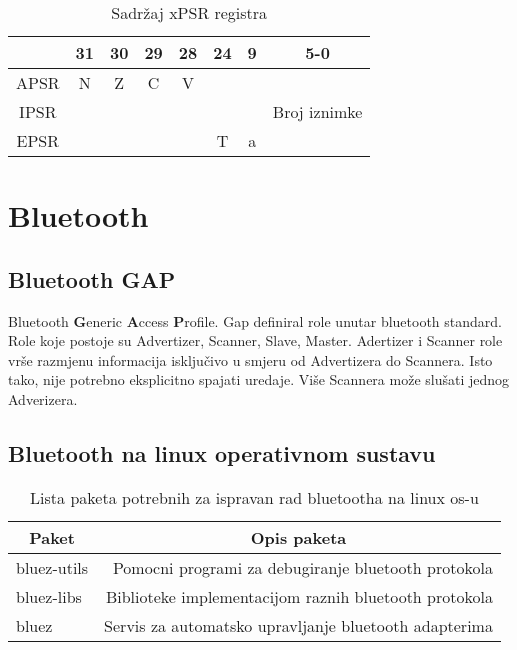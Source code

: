 \documentclass[times, utf8, diplomski]{fer}
\begin{document}
\begin{table}[h]
  \begin{center}
    \begin{tabular}{c|c|c|c|c||c||c||c|}
      \cline{2-8} & 31 & 30 & 29 & 28 & 24 & 9 & 5-0\\
      \hline
      \multicolumn{1}{|c|}{APSR} & N & Z & C & V & \multicolumn{3}{c|}{ } \\
      \hline
      \multicolumn{1}{|c|}{IPSR} & \multicolumn{6}{c||}{ } & Broj iznimke \\
      \hline
      \multicolumn{1}{|c|}{EPSR} & \multicolumn{4}{c||}{ } & T & a & \\
      \hline
    \end{tabular}
    \caption{Sadr\v{z}aj xPSR registra}
  \end{center}
\end{table}

\newpage
\section{Bluetooth}
\subsection{Bluetooth GAP}
Bluetooth \textbf{G}eneric \textbf{A}ccess \textbf{P}rofile.
Gap definiral role unutar bluetooth standard. Role koje postoje su Advertizer, Scanner, Slave, Master. Adertizer i Scanner role vr\v{s}e razmjenu informacija isklju\v{c}ivo u smjeru
od Advertizera do Scannera. Isto tako, nije potrebno eksplicitno spajati uredaje.
Vi\v{s}e Scannera mo\v{z}e slu\v{s}ati jednog Adverizera.

\subsection{Bluetooth na linux operativnom sustavu}

\begin{table}[h]
  \begin{center}
    \begin{tabular}[c]{l|r}
      \multicolumn{1}{c|}{\textbf{Paket}} & 
      \multicolumn{1}{c}{\textbf{Opis paketa}} \\
      \hline
      bluez-utils & Pomocni programi za debugiranje bluetooth protokola \\
      bluez-libs & Biblioteke implementacijom raznih bluetooth protokola \\
      bluez & Servis za automatsko upravljanje bluetooth adapterima \\
      \hline
    \end{tabular}
  \caption{Lista paketa potrebnih za ispravan rad bluetootha na linux os-u}
  \end{center}
\end{table}
\end{document}
